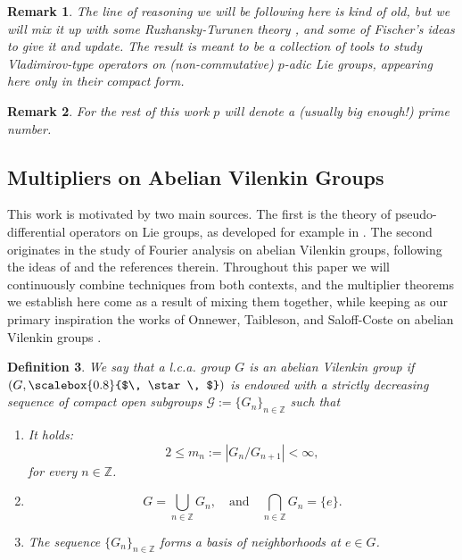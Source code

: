 \documentclass[12pt, reqno]{amsart}
\newtheorem{defi}{Definition}[section]
\newtheorem{rem}[defi]{Remark}
\newcommand{\1}{\mathds{1}}
\newcommand{\smallstar}{\scalebox{0.8}{$\, \star \, $}}
\begin{document}
\begin{rem}
    The line of reasoning we will be following here \cite{Kitada1987, Onneweer1985, Onneweer1989} is kind of old, but we will mix it up with some Ruzhansky-Turunen theory \cite{Ruzhansky2010, Ruzhansky2015}, and some of Fischer's ideas  \cite{Fischer2015, Fischer2020} to give it and update. The result is meant to be a collection of tools to study Vladimirov-type operators on (non-commutative) $p$-adic Lie groups, appearing here only in their compact form. 
\end{rem}

\begin{rem}
    For the rest of this work $p$ will denote a (usually big enough!) prime number. 
\end{rem}
\subsection{Multipliers on Abelian Vilenkin Groups}
This work is motivated by two main sources. The first is the theory of pseudo-differential operators on Lie groups, as developed for example in \cite{Rockland1978, Ruzhansky2010}. The second originates in the study of Fourier analysis on abelian Vilenkin groups, following the ideas of \cite{SaloffCoste1986} and the references therein. Throughout this paper we will continuously combine techniques from both contexts, and the multiplier theorems we establish here come as a result of mixing them together, while keeping as our primary inspiration the works of Onnewer, Taibleson, and Saloff-Coste on abelian Vilenkin groups \cite{Onneweer1985, SaloffCoste1986}. 

\begin{defi}\normalfont
We say that a l.c.a. group $G$ is an \emph{abelian Vilenkin group} if $(G, \smallstar)$ is endowed with a strictly decreasing sequence of compact open subgroups $\mathcal{G} := \{G_n\}_{n \in \mathbb{Z}}$ such that
\begin{enumerate}
    \item It holds:
    \[
    2 \leq m_n := |G_n / G_{n+1}| < \infty,
    \]
    for every $n \in \mathbb{Z}$.
    \item 
    \[
    G = \bigcup_{n \in \mathbb{Z}} G_n, \quad \text{and} \quad \bigcap_{n \in \mathbb{Z}} G_n = \{e\}.
    \]
    \item The sequence $\{G_n\}_{n \in \mathbb{Z}}$ forms a basis of neighborhoods at $e \in G$.
\end{enumerate}
\end{defi}
\end{document}
